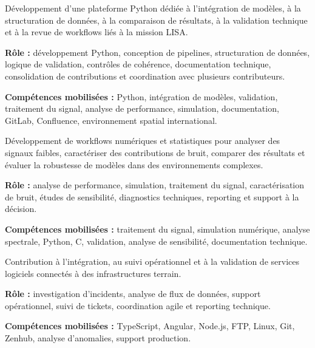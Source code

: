 \documentclass[8pt,a4paper,ragged2e,withhyper]{altacv}
\begin{document}
Développement d’une plateforme Python dédiée à l’intégration de modèles, à la structuration de données, à la comparaison de résultats, à la validation technique et à la revue de workflows liés à la mission LISA.

\textbf{Rôle :} développement Python, conception de pipelines, structuration de données, logique de validation, contrôles de cohérence, documentation technique, consolidation de contributions et coordination avec plusieurs contributeurs.

\textbf{Compétences mobilisées :} Python, intégration de modèles, validation, traitement du signal, analyse de performance, simulation, documentation, GitLab, Confluence, environnement spatial international.

\divider


Développement de workflows numériques et statistiques pour analyser des signaux faibles, caractériser des contributions de bruit, comparer des résultats et évaluer la robustesse de modèles dans des environnements complexes.

\textbf{Rôle :} analyse de performance, simulation, traitement du signal, caractérisation de bruit, études de sensibilité, diagnostics techniques, reporting et support à la décision.

\textbf{Compétences mobilisées :} traitement du signal, simulation numérique, analyse spectrale, Python, C, validation, analyse de sensibilité, documentation technique.

\divider


Contribution à l’intégration, au suivi opérationnel et à la validation de services logiciels connectés à des infrastructures terrain.

\textbf{Rôle :} investigation d’incidents, analyse de flux de données, support opérationnel, suivi de tickets, coordination agile et reporting technique.

\textbf{Compétences mobilisées :} TypeScript, Angular, Node.js, FTP, Linux, Git, Zenhub, analyse d’anomalies, support production.


\vspace{-.3cm}
\end{document}
